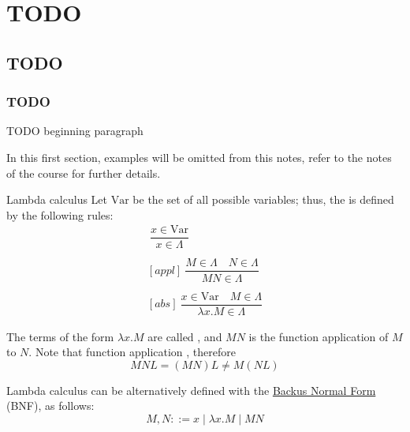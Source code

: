 \documentclass[a4paper, 12pt]{report}
\institute{\curlyquotes{\hspace{0.25mm}Sapienza} Università di Roma}
\subtitle{Appunti integrati con il libro \book}
\author{\textit{Autore}\\\authorName}
\institute{\curlyquotes{\hspace{0.25mm}Sapienza} University of Rome}
\subtitle{Lecture notes integrated with the book \book}
\author{\textit{Author}\\\authorName}
\title{\courseName}
\date{\today}
\begin{document}
    \maketitle

    {
        \hypersetup{allcolors=black}

        \romantableofcontents
    }

    \introduction


    \chapter{TODO}

    \section{TODO}

    \subsection{TODO}

    TODO beginning paragraph

    In this first section, examples will be omitted from this notes, refer to the notes of the  course for further details.

    \begin{frameddefn}[breakable]{Lambda calculus}
        Let $\mathrm{Var}$ be the set of all possible variables; thus, the  is defined by the following rules:
        \begin{gather*}
            [var] \ \dfrac{x \in \mathrm{Var}}{x \in \Lambda} \\ \\
            [appl] \ \dfrac{M \in \Lambda \quad N \in \Lambda}{M N \in \Lambda} \\ \\
            [abs] \ \dfrac{x \in \mathrm{Var} \quad M \in \Lambda}{\lambda x.M \in \Lambda}
        \end{gather*}

        The terms of the form $\lambda x.M$ are called , and $MN$ is the function application of $M$ to $N$. Note that function application , therefore $$MNL = (MN)L \neq M(NL)$$

        Lambda calculus can be alternatively defined with the \href{https://en.wikipedia.org/wiki/Backus%E2%80%93Naur_form}{Backus Normal Form} (BNF), as follows: $$M, N ::= x \mid \lambda x.M \mid M N$$
    \end{frameddefn}
\end{document}
